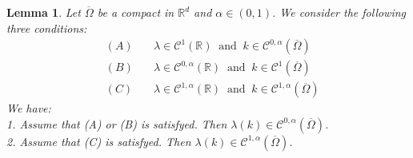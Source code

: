 \documentclass{elsart}
\newtheorem{lemm}[defi]{Lemma}
\begin{document}
\begin{lemm}
Let $\overline{\Omega}$ be a compact in $\mathbb R^d$ and $\alpha \in (0,1)$. We consider the following three conditions: 
\begin{eqnarray*}
&(A)& \quad \lambda \in \mathcal{C}^1(\mathbb R) \ \text{ and } \ 
k \in \mathcal{C}^{0,\alpha}(\overline{\Omega}) \\ 
&(B)& \quad \lambda \in \mathcal{C}^{0,\alpha}(\mathbb R) \ \text{ and } \ 
k \in \mathcal{C}^{1}(\overline{\Omega}) \\
&(C)& \quad \lambda \in \mathcal{C}^{1,\alpha}(\mathbb R) \ \text{ and } \ 
k \in \mathcal{C}^{1,\alpha}(\overline{\Omega})
\end{eqnarray*}
We have: \\ 

1. Assume that (A) or (B) is satisfyed. Then $\lambda(k) \in \mathcal{C}^{0,\alpha}(\overline{\Omega})$. \\ 
2. Assume that (C) is satisfyed. Then $\lambda(k) \in \mathcal{C}^{1,\alpha}(\overline{\Omega})$.
\end{lemm}
\end{document}
